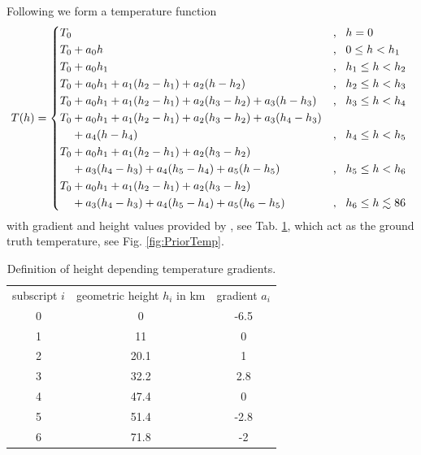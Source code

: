 Following \cite{atmosphere1976us} we form a temperature function
\begin{align}
	T(h) = \begin{cases*}
			T_0 &, \, \text{$h  = 0$}\\
			T_0 + a_0 h   &, \, \text{$0 \leq h < h_{1}$}\\
			T_0 + a_0 h_{1} &, \, \text{$h_{1} \leq  h < h_{2}$}\\
			T_0 + a_0 h_{1} + a_1 (h_2   - h_1)  + a_2 (h   - h_2)  &,  \, \text{$h_{2} \leq h < h_{3}$}\\
			T_0 + a_0 h_{1} + a_1 (h_2   - h_1)  + a_2 (h_3   - h_2) + a_3 (h   - h_3) &, \, \text{$h_{3} \leq h < h_{4}$}\\
			T_0 + a_0 h_{1} + a_1 (h_2   - h_1)  + a_2 (h_3   - h_2) + a_3 (h_4   - h_3)&\nonumber \\
			\hphantom{{} T_0 } + a_4 (h   - h_4) &,  \, \text{$h_{4} \leq h < h_{5}$}\\
			T_0 + a_0 h_{1} + a_1 (h_2   - h_1)  + a_2 (h_3   - h_2) &\nonumber \\
			\hphantom{{} T_0 } + a_3 (h_4   - h_3) + a_4 (h_5   - h_4)+ a_5 (h   - h_5) &,  \, \text{$h_{5} \leq h < h_{6}$}\\
			T_0 + a_0 h_{1} + a_1 (h_2   - h_1) + a_2 (h_3   - h_2)  &\nonumber\\
			\hphantom{{} T_0} + a_3 (h_4   - h_3) + a_4 (h_5   - h_4)+ a_5 (h_6   - h_5)  &,  \, \text{$h_{6} \leq h \lesssim 86$}
	\end{cases*} 
\label{eq:tempFunc}
\end{align}
with gradient and height values provided by \cite{atmosphere1976us}, see Tab. \ref{tab:tempGrad}, which act as the ground truth temperature, see Fig. \ref{fig:PriorTemp}.
\begin{table}
	\centering
	\begin{tabular}{ |c||c|c|  }
		\hline
		subscript $i$ & geometric height $h_i$ in km&gradient $a_i$\\
		\hhline{|=||=|=|}
		0& 0 & -6.5\\
		1& 11 & 0\\
		2& 20.1& 1\\
		3& 32.2& 2.8\\
		4& 47.4& 0\\
		5& 51.4& -2.8\\
		6& 71.8& -2\\
		\hline
	\end{tabular}
\caption[Temperature gradients]{Definition of height depending temperature gradients.}
\label{tab:tempGrad}
\end{table}

